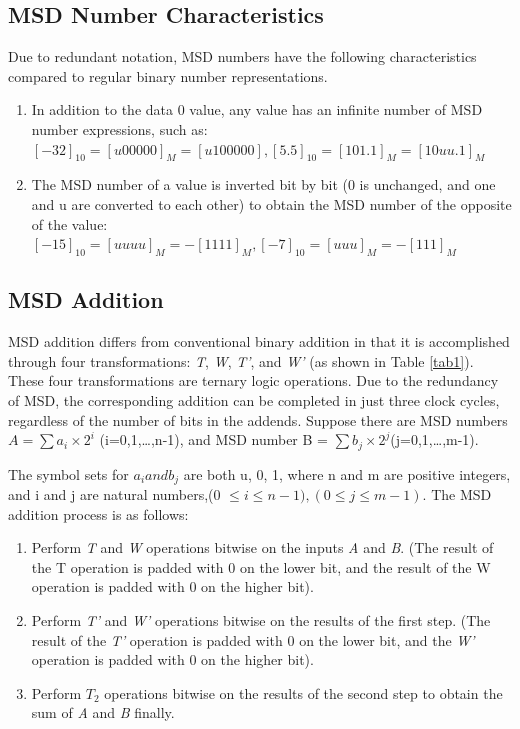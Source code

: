 \documentclass[electronics,article,accept,pdftex,moreauthors]{Definitions/mdpi}
\begin{document}
\subsection{MSD Number Characteristics}
Due to redundant notation, MSD numbers have the following characteristics compared to regular binary number representations.
\begin{enumerate}
    \item In addition to the data 0 value, any value has an infinite number of MSD number expressions, such as:
    $[-32]_{10}=[u00000]_M=[u100000],[5.5]_{10}=[101.1]_M=[10uu.1]_M$
    \item The MSD number of a value is inverted bit by bit (0 is unchanged, and one and u are converted to each other) to obtain the MSD number of the opposite of the value:
    $[-15]_{10}=[uuuu]_M=-[1111]_M,[-7]_{10}=[uuu]_M=-[111]_M$
\end{enumerate}
\subsection{MSD Addition}
MSD addition differs from conventional binary addition in that it is accomplished through four transformations: \textit{T},\textit{ W}, \textit{T’}, and \textit{W’} (as shown in Table \ref{tab1}). These four transformations are ternary logic operations. Due to the redundancy of MSD, the corresponding addition can be completed in just three clock cycles, regardless of the number of bits in the addends\cite{ref20}. Suppose there are MSD numbers $A = \sum a_i \times 2^i$ (i=0,1,…,n-1), and MSD number B = $\sum b_j \times 2^j$(j=0,1,…,m-1).

The symbol sets for $a_i and b_j$ are both {u, 0, 1}, where n and m are positive integers, and i and j are natural numbers,(0 $\leq i \leq n-1), (0 \leq j \leq m-1)$. The MSD addition process is as follows:

\begin{enumerate}[label={\arabic*).}]
\item  Perform\textit{ T} and \textit{W} operations bitwise on the inputs \textit{A} and \textit{B}. (The result of the T operation is padded with 0 on the lower bit, and the result of the W operation is padded with 0 on the higher bit).
\item Perform \textit{T’} and \textit{W’} operations bitwise on the results of the first step. (The result of the \textit{T’} operation is padded with 0 on the lower bit, and the \textit{W’} operation is padded with 0 on the higher bit).
\item  Perform $T_2$ operations bitwise on the results of the second step to obtain the sum of \textit{A} and \textit{B} finally.
\end{enumerate}
\end{document}
